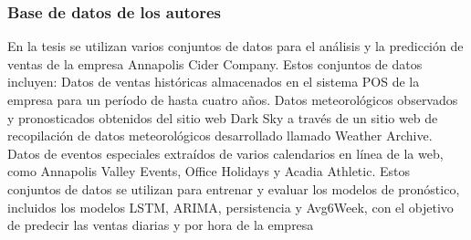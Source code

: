 \subsubsection{Base de datos de los autores}
En la tesis se utilizan varios conjuntos de datos para el análisis y la predicción de ventas de la empresa Annapolis Cider Company. Estos conjuntos de datos incluyen:
Datos de ventas históricas almacenados en el sistema POS de la empresa para un período de hasta cuatro años.
Datos meteorológicos observados y pronosticados obtenidos del sitio web Dark Sky a través de un sitio web de recopilación de datos meteorológicos desarrollado llamado Weather Archive.
Datos de eventos especiales extraídos de varios calendarios en línea de la web, como Annapolis Valley Events, Office Holidays y Acadia Athletic.
Estos conjuntos de datos se utilizan para entrenar y evaluar los modelos de pronóstico, incluidos los modelos LSTM, ARIMA, persistencia y Avg6Week, con el objetivo de predecir las ventas diarias y por hora de la empresa


